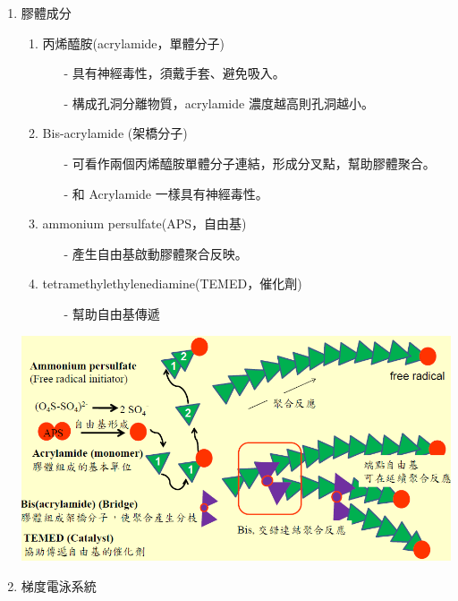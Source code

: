 \begin{enumerate}
  \item 膠體成分
  \begin{enumerate}[label=\alph*.]
    \item 丙烯醯胺(acrylamide，單體分子)
    \begin{itemize}[]
      \item[-] 具有神經毒性，須戴手套、避免吸入。
      \item[-]  構成孔洞分離物質，acrylamide 濃度越高則孔洞越小。
    \end{itemize}

    \item Bis-acrylamide (架橋分子)
    \begin{itemize}[]
      \item[-] 可看作兩個丙烯醯胺單體分子連結，形成分叉點，幫助膠體聚合。
      \item[-] 和 Acrylamide 一樣具有神經毒性。
    \end{itemize}
    \item ammonium persulfate(APS，自由基)
    \begin{itemize}[]
      \item[-] 產生自由基啟動膠體聚合反映。
    \end{itemize}
    \item tetramethylethylenediamine(TEMED，催化劑)
    \begin{itemize}[]
      \item[-] 幫助自由基傳遞 
    \end{itemize}
  \end{enumerate}

  \begin{center}
    \includegraphics[width=.7\textwidth]{paste_src/2023-11-13-16-17-57.png}
  \end{center}

  \item 梯度電泳系統
  







\end{enumerate}
